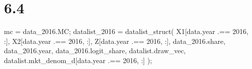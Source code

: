 \documentclass[
  letterpaper,
  DIV=11,
  numbers=noendperiod]{scrreprt}
\newenvironment{Shaded}{\begin{snugshade}}{\end{snugshade}}
\newcommand{\FloatTok}[1]{\textcolor[rgb]{0.68,0.00,0.00}{#1}}
\newcommand{\FunctionTok}[1]{\textcolor[rgb]{0.28,0.35,0.67}{#1}}
\newcommand{\NormalTok}[1]{\textcolor[rgb]{0.00,0.23,0.31}{#1}}
\newcommand{\OperatorTok}[1]{\textcolor[rgb]{0.37,0.37,0.37}{#1}}
\begin{document}
\hypertarget{section-11}{%
\section{6.4}\label{section-11}}

\begin{Shaded}
\begin{Highlighting}[]
\NormalTok{mc }\OperatorTok{=}\NormalTok{ data\_2016.MC;}
\NormalTok{datalist\_2016 }\OperatorTok{=} \FunctionTok{datalist\_struct}\NormalTok{(}
\NormalTok{    X1[data.year }\OperatorTok{.==} \FloatTok{2016}\NormalTok{, }\OperatorTok{:}\NormalTok{],}
\NormalTok{    X2[data.year }\OperatorTok{.==} \FloatTok{2016}\NormalTok{, }\OperatorTok{:}\NormalTok{],}
\NormalTok{    Z[data.year }\OperatorTok{.==} \FloatTok{2016}\NormalTok{, }\OperatorTok{:}\NormalTok{],}
\NormalTok{    data\_2016.share,}
\NormalTok{    data\_2016.year,}
\NormalTok{    data\_2016.logit\_share,}
\NormalTok{    datalist.draw\_vec,}
\NormalTok{    datalist.mkt\_denom\_d[data.year }\OperatorTok{.==} \FloatTok{2016}\NormalTok{, }\OperatorTok{:}\NormalTok{]}
\NormalTok{);}
\end{Highlighting}
\end{Shaded}
\end{document}
